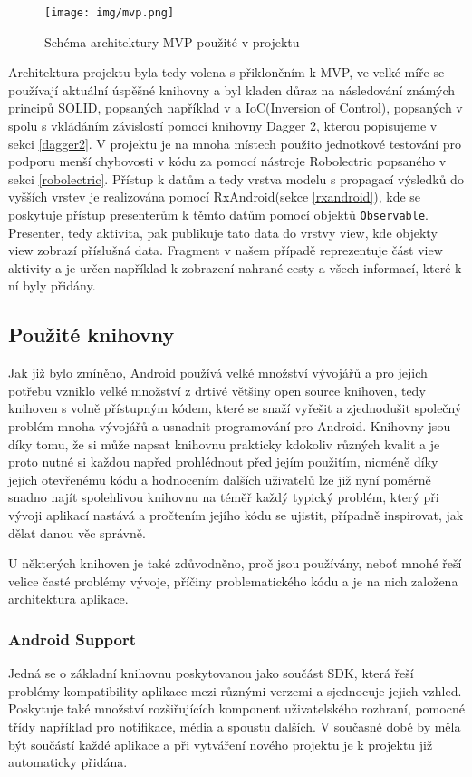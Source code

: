 \documentclass[czech,master,public,dept460,male,java,cpdeclaration]{diploma}
\begin{document}
\begin{figure}[H]
        \centering
                \texttt{[image: img/mvp.png]}
        \caption{Schéma architektury MVP použité v projektu}
        \label{fig:mvp}
\end{figure}

Architektura projektu byla tedy volena s přikloněním k MVP, ve velké míře se používají
aktuální úspěšné knihovny a byl kladen důraz na následování známých principů SOLID, popsaných
například v \cite{solid} a IoC(Inversion of Control), popsaných v \cite{ioc} spolu s vkládáním
závislostí pomocí knihovny Dagger 2, kterou popisujeme v sekci \ref{dagger2}.
V projektu je na mnoha místech použito jednotkové testování pro podporu menší chybovosti v kódu
za pomocí nástroje Robolectric popsaného v sekci \ref{robolectric}. Přístup k datům a tedy
vrstva modelu s propagací výsledků do vyšších vrstev je realizována
 pomocí RxAndroid(sekce \ref{rxandroid}), kde se poskytuje přístup
presenterům k těmto datům pomocí objektů \texttt{Observable}. Presenter, tedy aktivita,
pak publikuje tato data do vrstvy view, kde objekty view zobrazí příslušná data. Fragment v našem
případě reprezentuje část view aktivity a je určen například k zobrazení nahrané cesty a všech informací,
které k ní byly přidány.

\subsection{Použité knihovny}
Jak již bylo zmíněno, Android používá velké množství vývojářů a pro jejich potřebu vzniklo velké množství
z drtivé většiny open source knihoven, tedy knihoven s volně přístupným kódem,
 které se snaží vyřešit a zjednodušit společný problém mnoha vývojářů
a usnadnit programování pro Android. Knihovny jsou díky tomu, že si může napsat knihovnu prakticky kdokoliv
různých kvalit a je proto nutné si každou napřed prohlédnout před jejím použitím, nicméně díky jejich
otevřenému kódu a hodnocením dalších uživatelů lze již nyní poměrně snadno najít spolehlivou knihovnu na téměř každý
typický problém, který při vývoji aplikací nastává a pročtením jejího kódu se ujistit, případně inspirovat,
jak dělat danou věc správně.

U některých knihoven je také zdůvodněno, proč jsou používány,
neboť mnohé řeší velice časté problémy vývoje, příčiny problematického kódu a je na nich založena
architektura aplikace.

\subsubsection{Android Support}\label{androidsupport}
Jedná se o základní knihovnu poskytovanou jako součást SDK, která řeší problémy kompatibility aplikace
mezi různými verzemi a sjednocuje jejich vzhled. Poskytuje také množství rozšiřujících komponent uživatelského rozhraní,
pomocné třídy například pro notifikace, média a spoustu dalších. V současné době by měla být součástí každé
aplikace a při vytváření nového projektu je k projektu již automaticky přidána.
\end{document}
